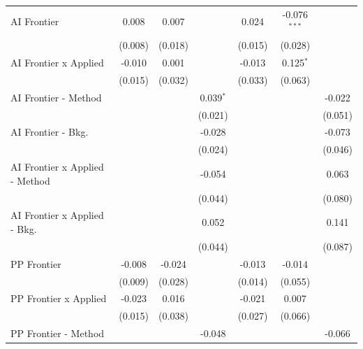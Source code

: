 \begin{tabular}{lcccccc}
   AI Frontier                    & 0.008        & 0.007        &               & 0.024   & -0.076$^{***}$ &   \\   
                                  & (0.008)      & (0.018)      &               & (0.015) & (0.028)        &   \\   
   AI Frontier x Applied          & -0.010       & 0.001        &               & -0.013  & 0.125$^{*}$    &   \\   
                                  & (0.015)      & (0.032)      &               & (0.033) & (0.063)        &   \\   
   AI Frontier - Method           &              &              & 0.039$^{*}$   &         &                & -0.022\\   
                                  &              &              & (0.021)       &         &                & (0.051)\\   
   AI Frontier - Bkg.             &              &              & -0.028        &         &                & -0.073\\   
                                  &              &              & (0.024)       &         &                & (0.046)\\   
   AI Frontier x Applied - Method &              &              & -0.054        &         &                & 0.063\\   
                                  &              &              & (0.044)       &         &                & (0.080)\\   
   AI Frontier x Applied - Bkg.   &              &              & 0.052         &         &                & 0.141\\   
                                  &              &              & (0.044)       &         &                & (0.087)\\   
   PP Frontier                    & -0.008       & -0.024       &               & -0.013  & -0.014         &   \\   
                                  & (0.009)      & (0.028)      &               & (0.014) & (0.055)        &   \\   
   PP Frontier x Applied          & -0.023       & 0.016        &               & -0.021  & 0.007          &   \\   
                                  & (0.015)      & (0.038)      &               & (0.027) & (0.066)        &   \\   
   PP Frontier - Method           &              &              & -0.048        &         &                & -0.066\\   

\end{tabular}
